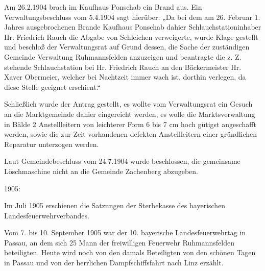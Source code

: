 \documentclass{book}
\begin{document}
Am 26.2.1904 brach im Kaufhaus Ponschab ein Brand aus. Ein Verwaltungsbeschluss
vom 5.4.1904 sagt hierüber: „Da bei dem am 26. Februar 1. Jahres ausgebrochenen
Brande Kaufhaus Ponschab dahier Schlauchstationinhaber Hr. Friedrich Rauch die
Abgabe von Schleichen verweigerte, wurde Klage gestellt und beschloß der
Verwaltungsrat auf Grund dessen, die Sache der zuständigen Gemeinde Verwaltung
Ruhmannsfelden anzuzeigen und beantragte die z. Z. stehende Schlauchstation bei
Hr. Friedrich Rauch an den Bäckermeister Hr. Xaver Obermeier, welcher bei
Nachtzeit immer wach ist, dorthin verlegen, da diese Stelle geeignet erschient.“

Schließlich wurde der Antrag gestellt, es wollte vom Verwaltungsrat ein Gesuch
an die Marktgemeinde dahier eingereicht werden, es wolle die Marktsverwaltung in
Bälde 2 Anstellleitern von leichterer Form 6 bis 7 cm hoch gütigst angeschafft
werden, sowie die zur Zeit vorhandenen defekten Anstellleitern einer gründlichen
Reparatur unterzogen werden.

Laut Gemeindebeschluss vom 24.7.1904 wurde beschlossen, die gemeinsame
Löschmaschine nicht an die Gemeinde Zachenberg abzugeben.

1905:

Im Juli 1905 erschienen die Satzungen der Sterbekasse des bayerischen
Landesfeuerwehrverbandes.

Vom 7. bis 10. September 1905 war der 10. bayerische Landesfeuerwehrtag in
Passau, an dem sich 25 Mann der freiwilligen Feuerwehr Ruhmannsfelden
beteiligten. Heute wird noch von den damals Beteiligten von den schönen Tagen in
Passau und von der herrlichen Dampfschiffsfahrt nach Linz erzählt.
\end{document}
